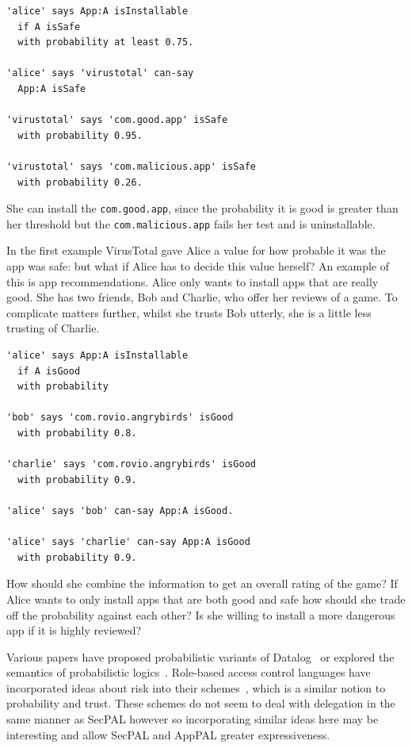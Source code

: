 \documentclass[thesis.tex]{subfiles}
\begin{document}
\begin{lstlisting}
'alice' says App:A isInstallable
  if A isSafe
  with probability at least 0.75.

'alice' says 'virustotal' can-say
  App:A isSafe

'virustotal' says 'com.good.app' isSafe
  with probability 0.95.

'virustotal' says 'com.malicious.app' isSafe
  with probability 0.26.
\end{lstlisting}

She can install the \texttt{com.good.app}, since the probability it is good is
greater than her threshold but the \texttt{com.malicious.app} fails her test and
is uninstallable. 

In the first example VirusTotal gave Alice a value for how probable it was the
app was safe: but what if Alice has to decide this value herself? An example of
this is app recommendations. Alice only wants to install apps that are really
good. She has two friends, Bob and Charlie, who offer her reviews of a game. To
complicate matters further, whilst she trusts Bob utterly, she is a little less
trusting of Charlie.

\begin{lstlisting}
'alice' says App:A isInstallable
  if A isGood
  with probability

'bob' says 'com.rovio.angrybirds' isGood
  with probability 0.8.

'charlie' says 'com.rovio.angrybirds' isGood
  with probability 0.9.

'alice' says 'bob' can-say App:A isGood.

'alice' says 'charlie' can-say App:A isGood
  with probability 0.9.
\end{lstlisting}

How should she combine the information to get an overall rating of the game? If
Alice wants to only install apps that are both good and safe how should she
trade off the probability against each other? Is she willing to install a more
dangerous app if it is highly reviewed?


Various papers have proposed probabilistic variants of
Datalog~\cite{fuhr_probabilistic_1995} or explored the semantics of
probabilistic logics~\cite{halpern_analysis_1990}. Role-based access control
languages have incorporated ideas about risk into their
schemes~\cite{josang_analysing_2004,dimmock_using_2004,salim_approach_2011},
which is a similar notion to probability and trust. These schemes do not seem
to deal with delegation in the same manner as SecPAL however so incorporating
similar ideas here may be interesting and allow SecPAL and AppPAL greater
expressiveness.
\end{document}
